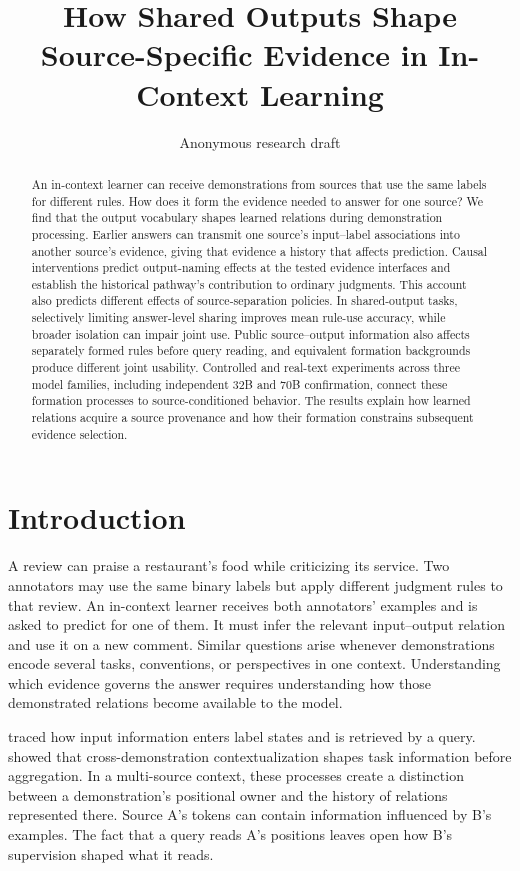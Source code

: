 \documentclass[11pt]{article}
\title{How Shared Outputs Shape Source-Specific Evidence in In-Context Learning}
\author{Anonymous research draft}
\begin{document}
\maketitle
\begin{abstract}

An in-context learner can receive demonstrations from sources that use the same labels for different rules. How does it form the evidence needed to answer for one source? We find that the output vocabulary shapes learned relations during demonstration processing. Earlier answers can transmit one source's input–label associations into another source's evidence, giving that evidence a history that affects prediction. Causal interventions predict output-naming effects at the tested evidence interfaces and establish the historical pathway's contribution to ordinary judgments. This account also predicts different effects of source-separation policies. In shared-output tasks, selectively limiting answer-level sharing improves mean rule-use accuracy, while broader isolation can impair joint use. Public source–output information also affects separately formed rules before query reading, and equivalent formation backgrounds produce different joint usability. Controlled and real-text experiments across three model families, including independent 32B and 70B confirmation, connect these formation processes to source-conditioned behavior. The results explain how learned relations acquire a source provenance and how their formation constrains subsequent evidence selection.

\end{abstract}

\section{Introduction}\label{introduction}

A review can praise a restaurant's food while criticizing its service. Two annotators may use the same binary labels but apply different judgment rules to that review. An in-context learner receives both annotators' examples and is asked to predict for one of them. It must infer the relevant input--output relation and use it on a new comment. Similar questions arise whenever demonstrations encode several tasks, conventions, or perspectives in one context. Understanding which evidence governs the answer requires understanding how those demonstrated relations become available to the model.

\citet{cho2025revisitingincontextlearninginference} traced how input information enters label states and is retrieved by a query. \citet{bakalova2025contextualizethenaggregatecircuitsincontextlearning} showed that cross-demonstration contextualization shapes task information before aggregation. In a multi-source context, these processes create a distinction between a demonstration's positional owner and the history of relations represented there. Source A's tokens can contain information influenced by B's examples. The fact that a query reads A's positions leaves open how B's supervision shaped what it reads.
\end{document}
